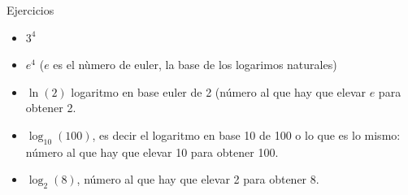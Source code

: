 \documentclass[
  ignorenonframetext,
  aspectratio=169,
  spanish,
]{beamer}
\providecommand{\tightlist}{%
  \setlength{\itemsep}{0pt}\setlength{\parskip}{0pt}}
\begin{document}
\begin{frame}{Ejercicios}
\label{ejercicios}
\begin{itemize}
\tightlist
\item
  \(3^4\)
\item
  \(e^4\) (\(e\) es el nùmero de euler, la base de los logarimos
  naturales)
\item
  \(\ln(2)\) logaritmo en base euler de 2 (número al que hay que elevar
  \(e\) para obtener 2.
\item
  \(\log_{10}(100)\), es decir el logaritmo en base 10 de 100 o lo que
  es lo mismo: número al que hay que elevar 10 para obtener 100.
\item
  \(\log_{2}(8)\), número al que hay que elevar 2 para obtener 8.
\end{itemize}
\end{frame}
\end{document}
